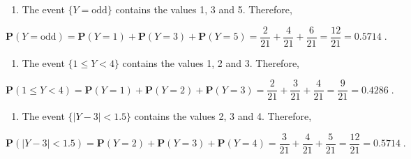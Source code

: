 \documentclass[
]{krantz}
\providecommand{\tightlist}{%
  \setlength{\itemsep}{0pt}\setlength{\parskip}{0pt}}
\newcommand{\Prob}{\mathbf{P}}
\theoremstyle{definition}
\theoremstyle{definition}
\theoremstyle{definition}
\theoremstyle{remark}
\begin{document}
\begin{enumerate}
\def\labelenumi{\arabic{enumi}.}
\setcounter{enumi}{2}
\tightlist
\item
  The event \(\{Y = \mbox{odd}\}\)
  contains the values 1, 3 and 5. Therefore,
\end{enumerate}

\[\Prob(Y = \mbox{odd}) = \Prob(Y=1) + \Prob(Y=3) + \Prob(Y=5) = \frac{2}{21} + \frac{4}{21} + \frac{6}{21} = \frac{12}{21}= 0.5714\;.\]

\begin{enumerate}
\def\labelenumi{\arabic{enumi}.}
\setcounter{enumi}{3}
\tightlist
\item
  The event \(\{1 \leq Y < 4\}\)
  contains the values 1, 2 and 3. Therefore,
\end{enumerate}

\[\Prob(1 \leq Y < 4) = \Prob(Y=1) + \Prob(Y=2) + \Prob(Y=3) = \frac{2}{21} + \frac{3}{21} + \frac{4}{21} = \frac{9}{21}= 0.4286\;.\]

\begin{enumerate}
\def\labelenumi{\arabic{enumi}.}
\setcounter{enumi}{4}
\tightlist
\item
  The event \(\{|Y -3| < 1.5\}\)
  contains the values 2, 3 and 4. Therefore,
\end{enumerate}

\[\Prob(|Y -3| < 1.5) = \Prob(Y=2) + \Prob(Y=3) + \Prob(Y=4) = \frac{3}{21} + \frac{4}{21} + \frac{5}{21} = \frac{12}{21}= 0.5714\;.\]
\end{document}
